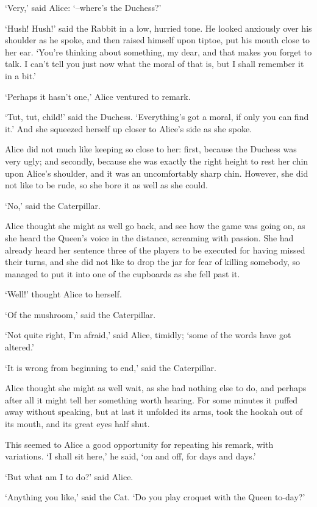 \documentclass[statementpaper,twoside,openany]{memoir}
\begin{document}
`Very,' said Alice: `--where's the Duchess?'

`Hush! Hush!' said the Rabbit in a low, hurried tone. He looked anxiously over his shoulder as he spoke, and then raised himself upon tiptoe, put his mouth close to her ear. `You're thinking about something, my dear, and that makes you forget to talk. I can't tell you just now what the moral of that is, but I shall remember it in a bit.'

`Perhaps it hasn't one,' Alice ventured to remark.

`Tut, tut, child!' said the Duchess. `Everything's got a moral, if only you can find it.' And she squeezed herself up closer to Alice's side as she spoke.

Alice did not much like keeping so close to her: first, because the Duchess was very ugly; and secondly, because she was exactly the right height to rest her chin upon Alice's shoulder, and it was an uncomfortably sharp chin. However, she did not like to be rude, so she bore it as well as she could.

`No,' said the Caterpillar.

Alice thought she might as well go back, and see how the game was going on, as she heard the Queen's voice in the distance, screaming with passion. She had already heard her sentence three of the players to be executed for having missed their turns, and she did not like to drop the jar for fear of killing somebody, so managed to put it into one of the cupboards as she fell past it.

`Well!' thought Alice to herself.

`Of the mushroom,' said the Caterpillar.

`Not quite right, I'm afraid,' said Alice, timidly; `some of the words have got altered.'

`It is wrong from beginning to end,' said the Caterpillar.

Alice thought she might as well wait, as she had nothing else to do, and perhaps after all it might tell her something worth hearing. For some minutes it puffed away without speaking, but at last it unfolded its arms, took the hookah out of its mouth, and its great eyes half shut.

This seemed to Alice a good opportunity for repeating his remark, with variations. `I shall sit here,' he said, `on and off, for days and days.'

`But what am I to do?' said Alice.

`Anything you like,' said the Cat. `Do you play croquet with the Queen to-day?'
\end{document}
